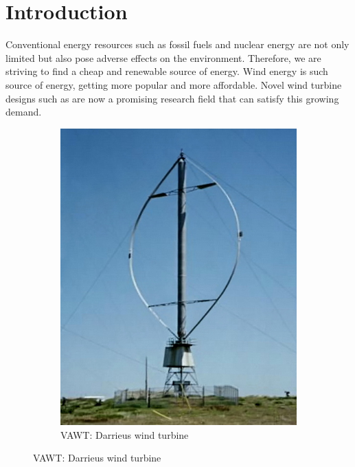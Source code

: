 \chapter{Introduction}
\label{ch:introduction}
Conventional energy resources such as fossil fuels and nuclear energy are not only limited but also pose adverse effects on the environment. Therefore, we are striving to find a cheap and renewable source of energy. Wind energy is such source of energy, getting more popular and more affordable. Novel wind turbine designs such as  are now a promising research field that can satisfy this growing demand.

	\begin{figure}[!b]
        \centering
        \begin{subfigure}[b]{0.25\textwidth}
                \includegraphics[height=0.2\textheight]{figures/introduction/Darrieus-windmill.jpg}
                \caption{VAWT: Darrieus wind turbine\cite{darrieusWindmill}}
                \label{fig:Darrieus-windmill}
        \end{subfigure}%
        \qquad \qquad%

\end{figure}
